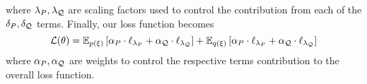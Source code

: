 %
where \(\lambda_{P}, \lambda_{{\mathcal{Q}}}\) are scaling factors used to control the
contribution from each of the \(\delta_{P}, \delta_{{\mathcal{Q}}}\) terms.
%
Finally, our loss function becomes
%
\begin{equation}
  \mathcal{L}{(\theta)} = \mathbb{E}_{p(\xi)}\left[
    \alpha_{P} \cdot \ell_{\lambda_{P}} + \alpha_{{\mathcal{Q}}} \cdot \ell_{\lambda_{{\mathcal{Q}}}}
  \right]
  + \mathbb{E}_{q(\xi)}\left[
    \alpha_{P} \cdot \ell_{\lambda_{P}} + \alpha_{{\mathcal{Q}}} \cdot \ell_{\lambda_{{\mathcal{Q}}}}
  \right]
\end{equation}
%
where \(\alpha_{P}, \alpha_{{\mathcal{Q}}}\) are weights to control the respective terms
contribution to the overall loss function.


%
